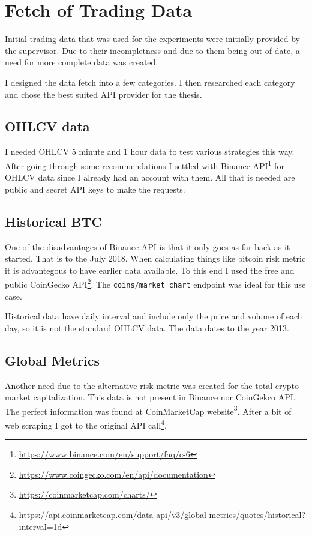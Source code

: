 \section{Fetch of Trading Data}
Initial trading data that was used for the experiments were initially provided by the supervisor. Due to their incompletness and due to them being out-of-date, a need for more complete data was created.

I designed the data fetch into a few categories. I then researched each category and chose the best suited API provider for the thesis.

\subsection*{OHLCV data}
I needed OHLCV 5 minute and 1 hour data to test various strategies this way. After going through some recommendations I settled with Binance API\footnote{\url{https://www.binance.com/en/support/faq/c-6}} for OHLCV data since I already had an account with them. All that is needed are public and secret API keys to make the requests.

\subsection*{Historical BTC}
One of the disadvantages of Binance API is that it only goes as far back as it started. That is to the July 2018. When calculating things like bitcoin risk metric it is advantegous to have earlier data available. To this end I used the free and public CoinGecko API\footnote{\url{https://www.coingecko.com/en/api/documentation}}. The \texttt{coins/market\_chart} endpoint was ideal for this use case.

Historical data have daily interval and include only the price and volume of each day, so it is not the standard OHLCV data. The data dates to the year 2013.

\subsection*{Global Metrics}
Another need due to the alternative risk metric was created for the total crypto market capitalization. This data is not present in Binance nor CoinGekco API. The perfect information was found at CoinMarketCap website\footnote{\url{https://coinmarketcap.com/charts/}}. After a bit of web scraping I got to the original API call\footnote{\url{https://api.coinmarketcap.com/data-api/v3/global-metrics/quotes/historical?interval=1d}}.

